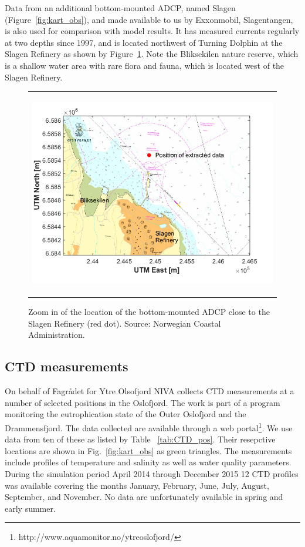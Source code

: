 
Data from an additional bottom-mounted ADCP, named Slagen (Figure~\ref{fig:kart_obs}), and made available to us by Exxonmobil, Slagentangen, is also used for comparison with model results. It has measured currents regularly at two depths since 1997, and is located northwest of Turning Dolphin at the Slagen Refinery as shown by Figure~\ref{fig:Slagen-kart}. Note the Bliksekilen nature reserve, which is a shallow water area with rare flora and fauna, which is located west of the Slagen Refinery. 

\begin{figure}[htb]
  \begin{center}
    \begin{tabular}{c}
      \includegraphics*[height=9cm]{Figurer/Slagen_kart} \\ 
    \end{tabular}
    \caption{\small Zoom in of the location of the bottom-mounted ADCP close to the Slagen Refinery (red dot). Source: Norwegian Coastal Administration.}
    \label{fig:Slagen-kart}
  \end{center}
\end{figure}

\subsection{CTD measurements}
\label{subsec:CTDo}
On behalf of Fagr{\aa}det for Ytre Olsofjord NIVA collects CTD measurements at a number of selected positions in the Oslofjord. The work is part of a program monitoring the eutrophication state of the Outer Oslofjord and the Drammensfjord. The data collected are available through a web portal\footnote{http://www.aquamonitor.no/ytreoslofjord/}. We use data from ten of these as listed by Table ~\ref{tab:CTD_pos}. Their resepctive locations are shown in Fig.~\ref{fig:kart_obs} as green triangles. The measurements include profiles of temperature and salinity as well as water quality parameters. During the simulation period April 2014 through December 2015 12 CTD profiles was available covering the months January, February, June, July, August, September, and November. No data are unfortunately available in spring and early summer. 

